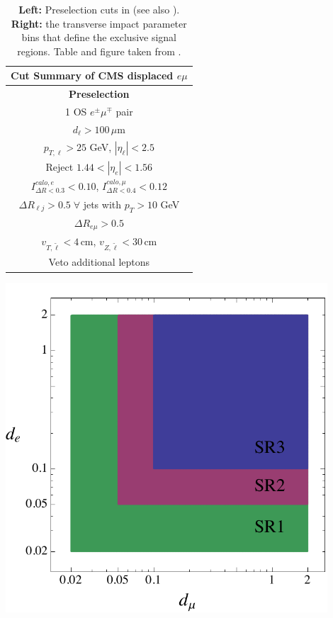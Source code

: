 \begin{table}%
\centering
\parbox{0.4\textwidth}{
\begin{footnotesize}
\begin{tabular}{| c |} \hline
{\bf Cut Summary of CMS displaced $e\mu$}    \\ \hline \hline
{\bf Preselection}    \\ \hline
{1 OS $e^\pm\mu^\mp$ pair} \\  
{$d_\ell>100\,\mu$m} \\
{$p_{T,\ell}>25$ GeV,  $ \left\vert \eta_\ell \right\vert <2.5$} \\  
{Reject $1.44 <  \left\vert \eta_e \right\vert<1.56$} \\  
{$I^{calo,e}_{\Delta R<0.3}<0.10$}, {$I^{calo,\mu}_{\Delta R<0.4}<0.12$} \\  
{ $\Delta R_{\ell j}>0.5\; \forall$ jets with $p_T>10$ GeV } \\
{$\Delta R_{e\mu}>0.5$} \\
{$v_{T,\tilde \ell} < 4 \,\mbox{cm}$, $ v_{Z,\tilde \ell} <  30 \,\mbox{cm}$}\\
{Veto additional leptons} \\
 \hline 
\end{tabular}
\end{footnotesize}
}
\qquad
\begin{minipage}[c]{0.45\textwidth}%
\centering
    \includegraphics[width=0.9\textwidth,angle=0]{ch5-figures/SRplot.pdf}
\label{tab:cuts}
\caption{{\bf Left:} Preselection cuts in \cite{Khachatryan:2014mea} (see also \cite{CMS:2014bra,CMSemuEfficiency}).  {\bf Right:} the transverse impact parameter bins that define the exclusive signal regions.  Table and figure taken from \cite{Evans:2016zau}.
  \label{tab:cuts}} 
\end{minipage}
\end{table}

